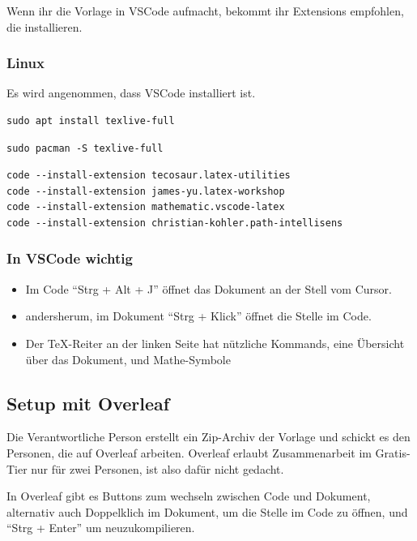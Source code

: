 Wenn ihr die Vorlage in VSCode aufmacht, bekommt ihr Extensions empfohlen, die installieren.

\subsubsection{Linux}
Es wird angenommen, dass VSCode installiert ist.

\begin{lstlisting}[caption={Latex mit apt}]
sudo apt install texlive-full
\end{lstlisting}

\begin{lstlisting}[caption={Latex mit pacman}]
sudo pacman -S texlive-full
\end{lstlisting}

\begin{lstlisting}[caption={VSCode Extensions}]
code --install-extension tecosaur.latex-utilities
code --install-extension james-yu.latex-workshop
code --install-extension mathematic.vscode-latex
code --install-extension christian-kohler.path-intellisens
\end{lstlisting}

\subsubsection{In VSCode wichtig}
\begin{itemize}
    \item Im Code ``Strg + Alt + J'' öffnet das Dokument an der Stell vom Cursor.
    \item andersherum, im Dokument ``Strg + Klick'' öffnet die Stelle im Code.
    \item Der \TeX-Reiter an der linken Seite hat nützliche Kommands, eine Übersicht über das Dokument, und Mathe-Symbole
\end{itemize}

\label{subsec:0-tutorial-overleaf}
\subsection{Setup mit Overleaf}
Die Verantwortliche Person erstellt ein Zip-Archiv der Vorlage und schickt es den Personen, die auf Overleaf arbeiten. Overleaf erlaubt Zusammenarbeit im Gratis-Tier nur für zwei Personen, ist also dafür nicht gedacht.

In Overleaf gibt es Buttons zum wechseln zwischen Code und Dokument, alternativ auch Doppelklich im Dokument, um die Stelle im Code zu öffnen, und ``Strg + Enter'' um neuzukompilieren.

